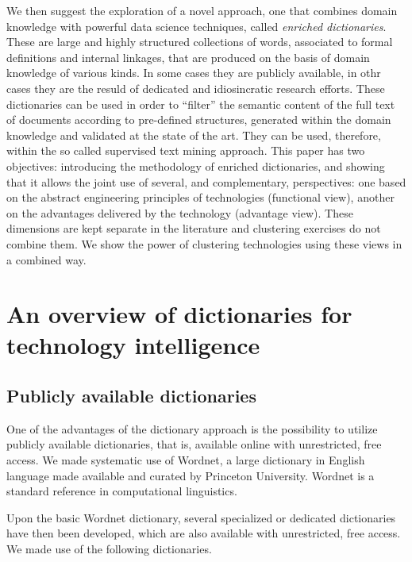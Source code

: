 \documentclass[]{book}
\begin{document}
We then suggest the exploration of a novel approach, one that combines
domain knowledge with powerful data science techniques, called
\emph{enriched dictionaries}. These are large and highly structured
collections of words, associated to formal definitions and internal
linkages, that are produced on the basis of domain knowledge of various
kinds. In some cases they are publicly available, in othr cases they are
the resuld of dedicated and idiosincratic research efforts. These
dictionaries can be used in order to ``filter'' the semantic content of
the full text of documents according to pre-defined structures,
generated within the domain knowledge and validated at the state of the
art. They can be used, therefore, within the so called supervised text
mining approach. This paper has two objectives: introducing the
methodology of enriched dictionaries, and showing that it allows the
joint use of several, and complementary, perspectives: one based on the
abstract engineering principles of technologies (functional view),
another on the advantages delivered by the technology (advantage view).
These dimensions are kept separate in the literature and clustering
exercises do not combine them. We show the power of clustering
technologies using these views in a combined way.

\section{An overview of dictionaries for technology
intelligence}\label{an-overview-of-dictionaries-for-technology-intelligence}

\subsection{Publicly available
dictionaries}\label{publicly-available-dictionaries}

One of the advantages of the dictionary approach is the possibility to
utilize publicly available dictionaries, that is, available online with
unrestricted, free access. We made systematic use of Wordnet, a large
dictionary in English language made available and curated by Princeton
University. Wordnet is a standard reference in computational
linguistics.

Upon the basic Wordnet dictionary, several specialized or dedicated
dictionaries have then been developed, which are also available with
unrestricted, free access. We made use of the following dictionaries.
\end{document}
